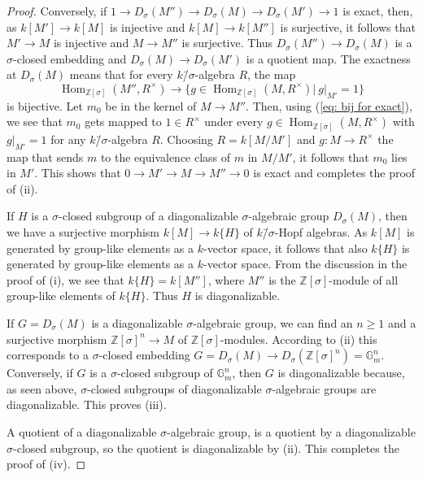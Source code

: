 \documentclass[oneside,reqno]{amsart}
\theoremstyle{definition}
\newcommand{\Hom}{\operatorname{Hom}}
\newcommand{\s}{\sigma}
\newcommand{\ks}{$k$\=/$\s$}
\newcommand{\Gm}{\mathbb{G}_m}
\newcommand{\ZZ}{\mathbb{Z}}
\begin{document}
\begin{proof}
	Conversely, if $1\to D_\s(M'')\to D_\s(M)\to D_\s(M')\to 1$ is exact, then, as $k[M']\to k[M]$ is injective and $k[M]\to k[M'']$ is surjective, it follows that $M'\to M$ is injective and $M\to M''$ is surjective. Thus  
	$D_\s(M'')\to D_\s(M)$ is a $\s$-closed embedding and $D_\s(M)\to D_\s(M')$ is a quotient map. The exactness at $D_\s(M)$ means that for every \ks-algebra $R$, the map 
	\begin{equation} \label{eq: bij for exact}
		\Hom_{\ZZ[\s]}(M'',R^\times)\to \{g\in \Hom_{\ZZ[\s]}(M,R^\times)|\ g|_{M'}=1\}
	\end{equation} is bijective. Let $m_0$ be in the kernel of $M\to M''$. 
	Then, using (\ref{eq: bij for exact}), we see that $m_0$ gets mapped to $1\in R^\times$ under every $g\in \Hom_{\ZZ[\s]}(M,R^\times)$ with $g|_{M'}=1$ for any \ks-algebra $R$. Choosing $R=k[M/M']$ and $g\colon M\to R^\times$ the map that sends $m$ to the equivalence class of $m$ in $M/M'$, it follows that $m_0$ lies in $M'$. This shows that  $0\to M'\to M\to M''\to 0$ is exact and completes the proof of (ii).
	
	If $H$ is a $\s$-closed subgroup of a diagonalizable $\s$-algebraic group $D_\s(M)$, then we have a surjective morphism $k[M]\to k\{H\}$ of \ks-Hopf algebras. As $k[M]$ is generated by group-like elements as a $k$-vector space, it follows that also $k\{H\}$ is generated by group-like elements as a $k$-vector space. From the discussion in the proof of (i), we see that $k\{H\}=k[M'']$, where $M''$ is the $\ZZ[\s]$-module of all group-like elements of $k\{H\}$. Thus $H$ is diagonalizable.
	
	If $G=D_\s(M)$ is a diagonalizable $\s$-algebraic group, we can find an $n\geq 1$ and a surjective morphism $\ZZ[\s]^n\to M$ of $\ZZ[\s]$-modules. According to (ii) this corresponds to a $\s$-closed embedding $G=D_\s(M)\to D_\s(\ZZ[\s]^n)=\Gm^n$. Conversely, if $G$ is a $\s$-closed subgroup of $\Gm^n$, then $G$ is diagonalizable because, as seen above, $\s$-closed subgroups of diagonalizable $\s$-algebraic groups are diagonalizable. This proves (iii).
	
	A quotient of a diagonalizable $\s$-algebraic group, is a quotient by a diagonalizable $\s$-closed subgroup, so the quotient is diagonalizable by (ii). This completes the proof of (iv). 
	

\end{proof}
\end{document}
